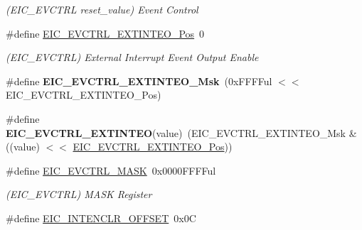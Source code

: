 \begin{DoxyCompactItemize}
\begin{DoxyCompactList}\small\item\em (E\+I\+C\+\_\+\+E\+V\+C\+T\+R\+L reset\+\_\+value) Event Control \end{DoxyCompactList}\item 
\hypertarget{group___s_a_m_l21___e_i_c_gaed4eb850843b4dea239dd997ae81008a}{}\#define \hyperlink{group___s_a_m_l21___e_i_c_gaed4eb850843b4dea239dd997ae81008a}{E\+I\+C\+\_\+\+E\+V\+C\+T\+R\+L\+\_\+\+E\+X\+T\+I\+N\+T\+E\+O\+\_\+\+Pos}~0\label{group___s_a_m_l21___e_i_c_gaed4eb850843b4dea239dd997ae81008a}

\begin{DoxyCompactList}\small\item\em (E\+I\+C\+\_\+\+E\+V\+C\+T\+R\+L) External Interrupt Event Output Enable \end{DoxyCompactList}\item 
\hypertarget{group___s_a_m_l21___e_i_c_ga941107dea5516bf17998a0012bee9e7d}{}\#define {\bfseries E\+I\+C\+\_\+\+E\+V\+C\+T\+R\+L\+\_\+\+E\+X\+T\+I\+N\+T\+E\+O\+\_\+\+Msk}~(0x\+F\+F\+F\+Ful $<$$<$ E\+I\+C\+\_\+\+E\+V\+C\+T\+R\+L\+\_\+\+E\+X\+T\+I\+N\+T\+E\+O\+\_\+\+Pos)\label{group___s_a_m_l21___e_i_c_ga941107dea5516bf17998a0012bee9e7d}

\item 
\hypertarget{group___s_a_m_l21___e_i_c_ga6644ed2806b2b22764ccdb89aa74c945}{}\#define {\bfseries E\+I\+C\+\_\+\+E\+V\+C\+T\+R\+L\+\_\+\+E\+X\+T\+I\+N\+T\+E\+O}(value)~(E\+I\+C\+\_\+\+E\+V\+C\+T\+R\+L\+\_\+\+E\+X\+T\+I\+N\+T\+E\+O\+\_\+\+Msk \& ((value) $<$$<$ \hyperlink{group___s_a_m_l21___e_i_c_gaed4eb850843b4dea239dd997ae81008a}{E\+I\+C\+\_\+\+E\+V\+C\+T\+R\+L\+\_\+\+E\+X\+T\+I\+N\+T\+E\+O\+\_\+\+Pos}))\label{group___s_a_m_l21___e_i_c_ga6644ed2806b2b22764ccdb89aa74c945}

\item 
\hypertarget{group___s_a_m_l21___e_i_c_ga613f01075fe9c2dd9dcc34c5dacfd6ed}{}\#define \hyperlink{group___s_a_m_l21___e_i_c_ga613f01075fe9c2dd9dcc34c5dacfd6ed}{E\+I\+C\+\_\+\+E\+V\+C\+T\+R\+L\+\_\+\+M\+A\+S\+K}~0x0000\+F\+F\+F\+Ful\label{group___s_a_m_l21___e_i_c_ga613f01075fe9c2dd9dcc34c5dacfd6ed}

\begin{DoxyCompactList}\small\item\em (E\+I\+C\+\_\+\+E\+V\+C\+T\+R\+L) M\+A\+S\+K Register \end{DoxyCompactList}\item 
\hypertarget{group___s_a_m_l21___e_i_c_gaf64517ce260f6884f881223efcd4fe66}{}\#define \hyperlink{group___s_a_m_l21___e_i_c_gaf64517ce260f6884f881223efcd4fe66}{E\+I\+C\+\_\+\+I\+N\+T\+E\+N\+C\+L\+R\+\_\+\+O\+F\+F\+S\+E\+T}~0x0\+C\label{group___s_a_m_l21___e_i_c_gaf64517ce260f6884f881223efcd4fe66}


\end{DoxyCompactItemize}
